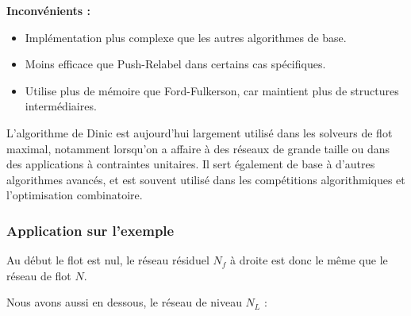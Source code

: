 \documentclass[a4paper]{article}
\begin{document}
\textbf{Inconvénients :}
\begin{itemize}
    \item Implémentation plus complexe que les autres algorithmes de base.
    \item Moins efficace que Push-Relabel dans certains cas spécifiques.
    \item Utilise plus de mémoire que Ford-Fulkerson, car maintient plus de structures intermédiaires.
\end{itemize}
L’algorithme de Dinic est aujourd’hui largement utilisé dans les solveurs de flot maximal, notamment lorsqu’on a affaire à des réseaux de grande taille ou dans des applications à contraintes unitaires. Il sert également de base à d’autres algorithmes avancés, et est souvent utilisé dans les compétitions algorithmiques et l’optimisation combinatoire\cite{article}.
\subsubsection{Application sur l'exemple}
Au début le flot est nul, le réseau résiduel $N_f$ à droite est donc le même que le réseau de flot $N$.

Nous avons aussi en dessous, le réseau de niveau $N_L$ :
\end{document}

